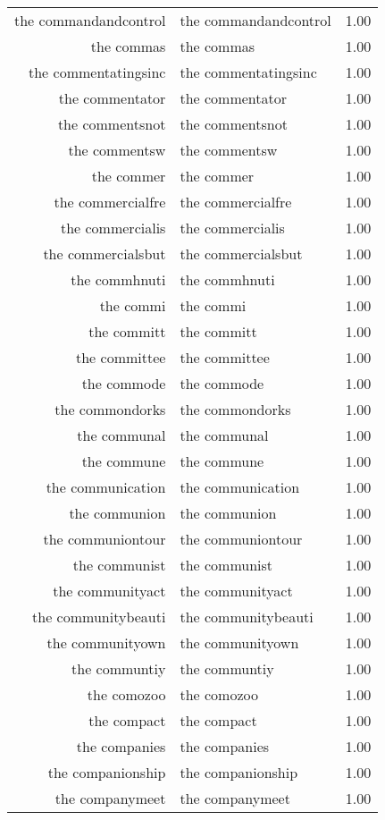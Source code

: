 \begin{table}[ht]
\begin{tabular}{rlr}
  the commandandcontrol & the commandandcontrol & 1.00 \\ 
  the commas & the commas & 1.00 \\ 
  the commentatingsinc & the commentatingsinc & 1.00 \\ 
  the commentator & the commentator & 1.00 \\ 
  the commentsnot & the commentsnot & 1.00 \\ 
  the commentsw & the commentsw & 1.00 \\ 
  the commer & the commer & 1.00 \\ 
  the commercialfre & the commercialfre & 1.00 \\ 
  the commercialis & the commercialis & 1.00 \\ 
  the commercialsbut & the commercialsbut & 1.00 \\ 
  the commhnuti & the commhnuti & 1.00 \\ 
  the commi & the commi & 1.00 \\ 
  the committ & the committ & 1.00 \\ 
  the committee & the committee & 1.00 \\ 
  the commode & the commode & 1.00 \\ 
  the commondorks & the commondorks & 1.00 \\ 
  the communal & the communal & 1.00 \\ 
  the commune & the commune & 1.00 \\ 
  the communication & the communication & 1.00 \\ 
  the communion & the communion & 1.00 \\ 
  the communiontour & the communiontour & 1.00 \\ 
  the communist & the communist & 1.00 \\ 
  the communityact & the communityact & 1.00 \\ 
  the communitybeauti & the communitybeauti & 1.00 \\ 
  the communityown & the communityown & 1.00 \\ 
  the communtiy & the communtiy & 1.00 \\ 
  the comozoo & the comozoo & 1.00 \\ 
  the compact & the compact & 1.00 \\ 
  the companies & the companies & 1.00 \\ 
  the companionship & the companionship & 1.00 \\ 
  the companymeet & the companymeet & 1.00 \\ 

\end{tabular}
\end{table}
